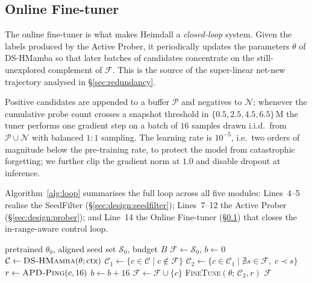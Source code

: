 \documentclass[conference]{IEEEtran}
\begin{document}
\subsection{Online Fine-tuner}
\label{sec:design:tuner}
The online fine-tuner is what makes
Heimdall a \emph{closed-loop} system.  Given the labels
produced by the Active Prober, it periodically updates the
parameters $\theta$ of DS-HMamba so that later batches of
candidates concentrate on the still-unexplored complement of
$\mathcal{F}$.  This is the source of the super-linear net-new
trajectory analysed in \S\ref{sec:redundancy}.

Positive candidates are appended to a buffer
$\mathcal{P}$ and negatives to $\mathcal{N}$; whenever the
cumulative probe count crosses a snapshot threshold in
$\{0.5,2.5,4.5,6.5\}$\,M the tuner performs one gradient step
on a batch of $16$ samples drawn i.i.d.\ from
$\mathcal{P}\!\cup\!\mathcal{N}$ with balanced $1{:}1$
sampling.  The learning rate is $10^{-5}$, i.e.\ two orders of
magnitude below the pre-training rate, to protect the model
from catastrophic forgetting; we further clip the gradient
norm at $1.0$ and disable dropout at inference.

Algorithm~\ref{alg:loop} summarises the full loop across all
five modules: Lines~4--5 realise the SeedFilter
(\S\ref{sec:design:seedfilter}); Lines~7--12 the Active Prober
(\S\ref{sec:design:prober}); and Line~14 the Online Fine-tuner
(\S\ref{sec:design:tuner}) that closes the in-range-aware
control loop.

\begin{algorithm}[t]
\caption{Online FRP discovery with in-range-aware feedback}
\label{alg:loop}
\begin{algorithmic}[1]
\Require pretrained $\theta_0$, aligned seed set $\mathcal{S}_{0}$, budget $B$
\State $\mathcal{F}\gets\mathcal{S}_{0}$, \; $b\gets 0$
   \State $\mathcal{C}\gets\textsc{DS-HMamba}(\theta;\text{ctx})$
   \State $\mathcal{C}_1\gets\{c\in\mathcal{C} \mid c\notin\mathcal{F}\}$
   \State $\mathcal{C}_2\gets\{c\in\mathcal{C}_1 \mid
       \nexists s\in\mathcal{F},\;c\prec s\}$
        \State $r\gets\textsc{APD-Ping}(c,16)$
        \State $b\gets b+16$
            \State $\mathcal{F}\gets\mathcal{F}\cup\{c\}$
        \EndIf
   \EndFor
   \State \textsc{FineTune}$(\theta;\,\mathcal{C}_2, r)$
\EndWhile
\State \Return $\mathcal{F}$
\end{algorithmic}
\end{algorithm}
\end{document}
